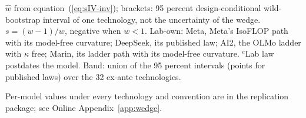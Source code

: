 \begin{table}[tp]
\begin{tablenotes}
$\hat w$ from equation~(\ref{eq:sIV-inv}); brackets: 95 percent design-conditional wild-bootstrap interval of one
technology, not the uncertainty of the wedge. $s=(w-1)/w$, negative when $w<1$. Lab-own: Meta, Meta's IsoFLOP path with
its model-free curvature; DeepSeek, its published law; AI2, the OLMo ladder with $\kappa$ free; Marin, its ladder path
with its model-free curvature. $^{e}$Lab law postdates the model. Band: union of the 95 percent intervals (points for
published laws) over the 32 ex-ante technologies.
\end{tablenotes}
\begin{tablenotes}[Source]
Per-model values under every technology and convention are in the replication package; see Online
Appendix~\ref{app:wedge}.
\end{tablenotes}
\end{table}
